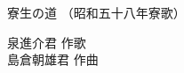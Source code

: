 \documentclass[10pt,b5j]{tarticle} %
\begin{document}
\begin{minipage}[c]{0.7\hsize} %
    \begin{center}
        {\LARGE
            寮生の道 %
        }
        {\small 
            （昭和五十八年寮歌） %
        }
    \end{center}
\end{minipage}
\begin{minipage}[c]{0.3\hsize} %
    \begin{flushright} %
        泉進介君 作歌\\島倉朝雄君 作曲 %
    \end{flushright}
\end{minipage}
\end{document}
